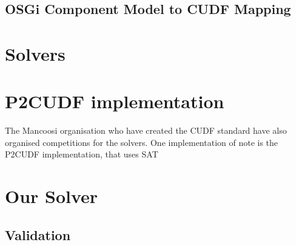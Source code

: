 

\subsection{OSGi Component Model to CUDF Mapping}




\section{Solvers}

\section{P2CUDF implementation}
The Mancoosi organisation who have created the CUDF standard have also organised competitions for the solvers.
One implementation of note is the P2CUDF implementation, that uses SAT

\section{Our Solver}





\subsection{Validation}
 

